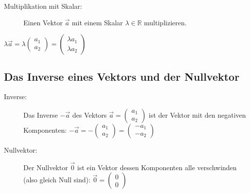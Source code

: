 \begin{description}
	\item[Multiplikation mit Skalar:]
	Einen Vektor $\vec{a}$ mit einem Skalar $\lambda \in \mathbb{R}$ multiplizieren. 
\end{description}

\begin{math}
	\lambda \vec{a} = 
	\lambda \begin{pmatrix} a_{1} \\ a_{2} \end{pmatrix} =
	\begin{pmatrix} \lambda a_{1} \\ \lambda a_{2} \end{pmatrix}
\end{math}

\subsection{Das Inverse eines Vektors und der Nullvektor}

\begin{description}
	\item[Inverse:]
	Das Inverse $-\vec{a}$ des Vektors
	\begin{math}
		\vec{a} = \begin{pmatrix} a_{1} \\ a_{2} \end{pmatrix}
	\end{math}
	ist der Vektor mit den negativen Komponenten:
	\begin{math}
		-\vec{a} = -\begin{pmatrix} a_{1} \\ a_{2} \end{pmatrix} =
		\begin{pmatrix} -a_{1} \\ -a_{2} \end{pmatrix}
	\end{math}
\end{description}

\begin{description}
	\item[Nullvektor:]
	Der Nullvektor $\vec{0}$ ist ein Vektor dessen Komponenten alle
	verschwinden (also gleich Null sind):
	\begin{math}
		\vec{0} = \begin{pmatrix} 0 \\ 0 \end{pmatrix}
	\end{math}
\end{description}

